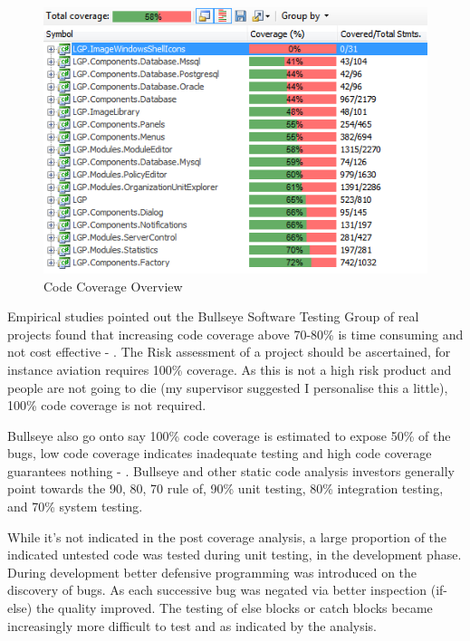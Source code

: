 		\begin{figure}[h!]
			\centering
			\includegraphics[scale=0.9]{pages/chapter4/figures/coverage-overview.png}
			\vspace{-3mm}
			\caption{Code Coverage Overview}
			\label{fig:MetricCoverageOverview}
		\end{figure}

		\normalsize
		{
			Empirical studies pointed out the Bullseye Software Testing Group of real projects found that increasing code coverage above 70-80\% is 
			time consuming and not cost effective - \citet{SteveCornett}. The Risk assessment of a project should be ascertained, for instance aviation requires 100\% coverage.  
			As this is not a high risk product and people are not going to die (my supervisor suggested I personalise this a little), 
			100\% code coverage is not required. 
			\newline
		}
		
		\vspace{-3mm}
		\normalsize
		{
			Bullseye also go onto say 100\% code coverage is estimated to expose 50\% of the bugs, low code coverage indicates inadequate testing and high code coverage 
			guarantees nothing - \citet{SteveCornett}.  Bullseye and other static code analysis investors generally point towards the 90, 80, 70 rule of, 90\% unit testing, 
			80\% integration testing, and 70\% system testing. \citet{SteveCornett}
			\newline
		}
		
		\vspace{-3mm}
		\normalsize
		{
			While it's not indicated in the post coverage analysis, a large proportion of the indicated untested code was tested 
			during unit testing, in the development phase.  During development better defensive programming was introduced on the discovery of bugs.
			As each successive bug was negated via better inspection (if-else) the quality improved.
			The testing of else blocks or catch blocks became increasingly more difficult to test and as indicated by the analysis.	
		}

